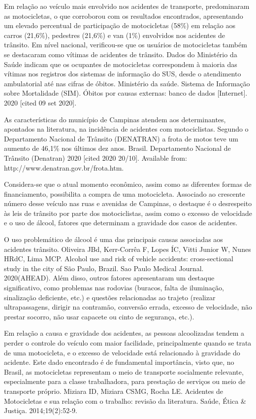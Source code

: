 Em relação ao veículo mais envolvido nos acidentes de transporte, predominaram as motocicletas, o que corroborou com os resultados encontrados, apresentando um elevado percentual de participação de motocicletas (58\%) em relação aos carros (21,6\%), pedestres (21,6\%) e van (1\%) envolvidos nos acidentes de trânsito. Em nível nacional, verificou-se que os usuários de motocicletas também se destacaram como vítimas de acidentes de trânsito. Dados do Ministério da Saúde indicam que os ocupantes de motocicletas correspondem à maioria das vítimas nos registros dos sistemas de informação do SUS, desde o atendimento ambulatorial até nas cifras de óbitos. Ministério da saúde. Sistema de Informação sobre Mortalidade (SIM). Óbitos por causas externas: banco de dados [Internet]. 2020 [cited 09 set 2020].

As características do município de Campinas atendem aos determinantes, apontados na literatura, na incidência de acidentes com motociclistas. Segundo o Departamento Nacional de Trânsito (DENATRAN) a frota de motos teve um aumento de 46,1\% nos últimos dez anos. Brasil. Departamento Nacional de Trânsito (Denatran) 2020 [cited 2020 20/10]. Available from: http://www.denatran.gov.br/frota.htm.

Considera-se que o atual momento econômico, assim como as diferentes formas de financiamento, possibilita a compra de uma motocicleta. Associado ao crescente número desse veículo nas ruas e avenidas de Campinas, o destaque é o desrespeito às leis de trânsito por parte dos motociclistas, assim como o excesso de velocidade e o uso de álcool, fatores que determinam a gravidade dos casos de acidentes.

O uso problemático de álcool é uma das principais causas associadas aos acidentes trânsito. Oliveira JBd, Kerr-Corrêa F, Lopes ÍC, Vitti Junior W, Nunes HRdC, Lima MCP. Alcohol use and risk of vehicle accidents: cross-sectional study in the city of São Paulo, Brazil. Sao Paulo Medical Journal. 2020(AHEAD). Além disso, outros fatores apresentaram um destaque significativo, como problemas nas rodovias (buracos, falta de iluminação, sinalização deficiente, etc.) e questões relacionadas ao trajeto (realizar ultrapassagens, dirigir na contramão, conversão errada, excesso de velocidade, não prestar socorro, não usar capacete ou cinto de segurança, etc.).

Em relação a causa e gravidade dos acidentes, as pessoas alcoolizadas tendem a perder o controle do veículo com maior facilidade, principalmente quando se trata de uma motocicleta, e o excesso de velocidade está relacionado à gravidade do acidente. Este dado encontrado é de fundamental importância, visto que, no Brasil, as motocicletas representam o meio de transporte socialmente relevante, especialmente para a classe trabalhadora, para prestação de serviços ou meio de transporte próprio. Miziara ID, Miziara CSMG, Rocha LE. Acidentes de Motocicletas e sua relação com o trabalho: revisão da literatura. Saúde, Ética & Justiça. 2014;19(2):52-9.

